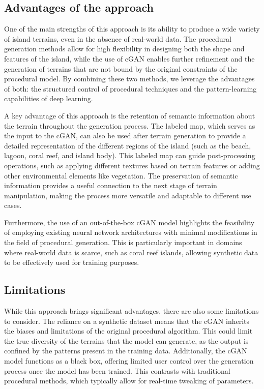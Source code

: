 \subsection{Advantages of the approach}

One of the main strengths of this approach is its ability to produce a wide variety of island terrains, even in the absence of real-world data. The procedural generation methods allow for high flexibility in designing both the shape and features of the island, while the use of cGAN enables further refinement and the generation of terrains that are not bound by the original constraints of the procedural model. By combining these two methods, we leverage the advantages of both: the structured control of procedural techniques and the pattern-learning capabilities of deep learning.

A key advantage of this approach is the retention of semantic information about the terrain throughout the generation process. The labeled map, which serves as the input to the cGAN, can also be used after terrain generation to provide a detailed representation of the different regions of the island (such as the beach, lagoon, coral reef, and island body). This labeled map can guide post-processing operations, such as applying different textures based on terrain features or adding other environmental elements like vegetation. The preservation of semantic information provides a useful connection to the next stage of terrain manipulation, making the process more versatile and adaptable to different use cases.

Furthermore, the use of an out-of-the-box cGAN model highlights the feasibility of employing existing neural network architectures with minimal modifications in the field of procedural generation. This is particularly important in domains where real-world data is scarce, such as coral reef islands, allowing synthetic data to be effectively used for training purposes.

\subsection{Limitations}

While this approach brings significant advantages, there are also some limitations to consider. The reliance on a synthetic dataset means that the cGAN inherits the biases and limitations of the original procedural algorithm. This could limit the true diversity of the terrains that the model can generate, as the output is confined by the patterns present in the training data. Additionally, the cGAN model functions as a black box, offering limited user control over the generation process once the model has been trained. This contrasts with traditional procedural methods, which typically allow for real-time tweaking of parameters.

